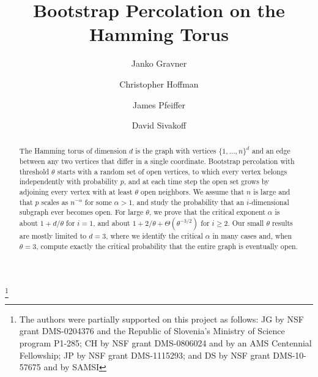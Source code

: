 \documentclass{amsart}
\numberwithin{equation}{section}
\theoremstyle{definition}
\theoremstyle{remark}
\begin{document}
\title{Bootstrap Percolation on the Hamming Torus}
\author{Janko Gravner}
\address{Janko Gravner, Department of Mathematics, University of California, Davis, CA 95616} 
\author{Christopher Hoffman}
\address{Christopher Hoffman, Department of Mathematics,
University of Washington, Seattle, WA 98195}
\author{James Pfeiffer}
\address{James Pfeiffer, Department of Mathematics,
University of Washington, Seattle, WA 98195}
\author{David Sivakoff}
\address{David Sivakoff,
Mathematics Department, Duke University, Durham, NC 27708}
\thanks{The authors were partially supported on this project 
as follows: JG by NSF grant DMS-0204376 and the
Republic of Slovenia's Ministry of Science program P1-285; CH by NSF grant DMS-0806024 and by an AMS Centennial Fellowship; JP by NSF grant DMS-1115293; and 
DS by NSF grant DMS-10-57675 and by SAMSI}





\begin{abstract}
 The Hamming torus of dimension $d$ is the graph with vertices $\{1,\dots, n\}^d$ and an edge between any two vertices that differ in a single coordinate. Bootstrap percolation with threshold $\theta$ starts with a random set of open vertices, to which every vertex belongs independently with probability $p$, and at each time step the open set grows by adjoining every vertex with at least $\theta$ open neighbors. We assume that $n$ is large and that $p$ scales as $n^{-\alpha}$ for some $\alpha>1$, and study the probability that an $i$-dimensional subgraph ever becomes open. For large $\theta$, we prove that the critical exponent $\alpha$ is about $1+d/\theta$ for $i=1$, and about $1+2/\theta+\Theta(\theta^{-3/2})$ for $i\ge 2$. Our small $\theta$ results are mostly limited to $d=3$, where we identify the critical $\alpha$ in many cases and, when $\theta=3$, compute exactly the critical probability that the entire graph is eventually open.
\end{abstract}

\maketitle
\end{document}
